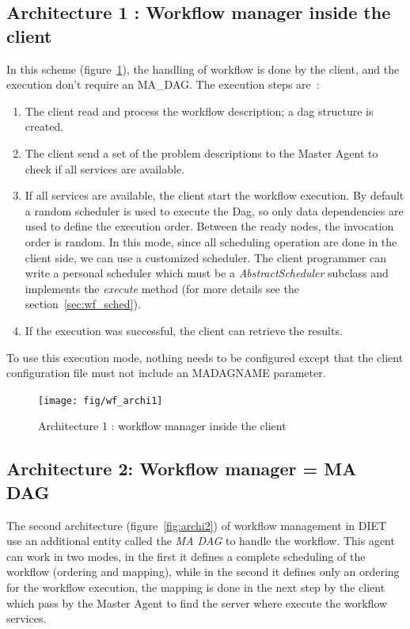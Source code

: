 \subsection{Architecture 1 : Workflow manager inside the client}
\label{sec:archi1}

In this scheme (figure~\ref{fig:archi1}), the handling of workflow is
done by the client, and the execution don't require an MA\_DAG. The
execution steps are~:

\begin{enumerate}
\item The client read and process the workflow description; a dag
  structure is created.
\item The client send a set of the problem descriptions to the
  Master Agent to check if all services are available.
\item If all services are available, the client start the workflow
  execution. By default a random scheduler is used to execute the Dag,
  so only data dependencies are used to define the execution order.
  Between the ready nodes, the invocation order is random. In this
  mode, since all scheduling operation are done in the client side, we
  can use a customized scheduler. The client programmer can write a
  personal scheduler which must be a \textit{AbstractScheduler}
  subclass and implements the \textit{execute} method (for more
  details see the section~\ref{sec:wf_sched}).
\item If the execution was successful, the client can retrieve the
  results.
\end{enumerate}

To use this execution mode, nothing needs to be configured except that
the client configuration file must not include an MADAGNAME parameter.

\begin{figure}[htbp]
  \centering
  \texttt{[image: fig/wf\_archi1]}
  \caption{Architecture 1 : workflow manager inside the client}
  \label{fig:archi1}
\end{figure}



\subsection{Architecture 2: Workflow manager = MA DAG}
\label{sec:archi2}

The second architecture (figure~\ref{fig:archi2}) of workflow
management in DIET use an additional entity called the \textit{MA DAG}
to handle the workflow. This agent can work in two modes, in the first
it defines a complete scheduling of the workflow (ordering and
mapping), while in the second it defines only an ordering for the
workflow execution, the mapping is done in the next step by the client
which pass by the Master Agent to find the server where execute the
workflow services.


